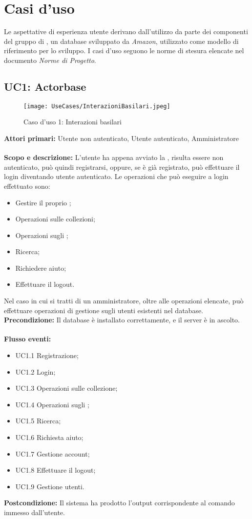 \documentclass{scalatekids-article}
\begin{document}
\section{Casi d'uso}
Le aspettative di esperienza utente derivano dall'utilizzo da parte dei
componenti del gruppo di , un database 
sviluppato da \textit{Amazon}, utilizzato come modello di riferimento per lo
sviluppo. I casi d'uso seguono le norme di stesura elencate nel documento \textit{Norme di Progetto}.%
\subsection{UC1: Actorbase}
\begin{center}
  \begin{figure}[H]
    \texttt{[image: UseCases/InterazioniBasilari.jpeg]}
    \caption{Caso d'uso 1: Interazioni basilari}
  \end{figure}
\end{center}
\textbf{Attori primari:} Utente non autenticato, Utente autenticato, Amministratore\\ \\
\textbf{Scopo e descrizione:}
L’utente ha appena avviato la , risulta essere non autenticato, può quindi
registrarsi, oppure, se è già registrato, può effettuare il login diventando utente
autenticato. Le operazioni che può eseguire a login effettuato sono:
\begin{itemize}
\item Gestire il proprio ;
\item Operazioni sulle collezioni;
\item Operazioni sugli ;
\item Ricerca;
\item Richiedere aiuto;
\item Effettuare il logout.
\end{itemize}
Nel caso in cui si tratti di un amministratore, oltre alle operazioni elencate, può effettuare operazioni di gestione sugli utenti
esistenti nel database.
\textbf{Precondizione:} Il database è installato correttamente, e il server è in ascolto.\\ \\
\textbf{Flusso eventi:}
\begin{itemize}
\item UC1.1 Registrazione;
\item UC1.2 Login;
\item UC1.3 Operazioni sulle collezione;
\item UC1.4 Operazioni sugli ;
\item UC1.5 Ricerca;
\item UC1.6 Richiesta aiuto;
\item UC1.7 Gestione account;
\item UC1.8 Effettuare il logout;
\item UC1.9 Gestione utenti.
\end{itemize}
\textbf{Postcondizione:} Il sistema ha prodotto l'output corrispondente al comando immesso dall'utente.
\end{document}
